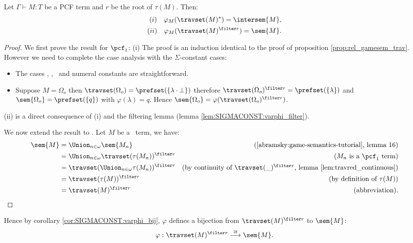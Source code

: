 \begin{proposition}
Let $\Gamma \vdash M : T$ be a PCF term and $r$ be the root of
$\tau(M)$. Then:
\begin{align*}
(i)  \quad\varphi_M(\travset(M)^*) = \intersem{M},  \\
(ii) \quad \varphi_M(\travset(M)^{\filter r}) = \sem{M}.
\end{align*}
\end{proposition}
\begin{proof}
We first prove the result for $\pcf_1$: (i) The proof is an
induction identical to the proof of proposition
\ref{prop:rel_gamesem_trav}. However we need to complete the case
analysis with the $\Sigma$-constant cases:
\begin{itemize}
\item The cases \pcfsucc, \pcfpred, \pcfcond\ and numeral constants are straightforward.

\item Suppose $M = \Omega_o$ then $\travset(\Omega_o) = \prefset ( \{ \lambda \cdot \bot \} )$ therefore
$\travset(\Omega_o)^{\filter r} = \prefset( \{ \lambda \} )$
and $\sem{\Omega_o} = \prefset( \{ q \})$ with $\varphi(\lambda) =
q$. Hence $\sem{\Omega_o} = \varphi
(\travset(\Omega_o)^{\filter r})$.
\end{itemize}
(ii) is a direct consequence of (i) and the filtering lemma (lemma
\ref{lem:SIGMACONST:varphi_filter}). \vspace{10pt}

\noindent We now extend the result to \pcf. Let $M$ be a \pcf\ term,
we have:
\begin{align*}
\sem{M} &= \Union_{n\in\omega} \sem{M_n} & (\mbox{\cite{abramsky:game-semantics-tutorial}, lemma 16})\\
&= \Union_{n\in\omega} \travset(\tau(M_n))^{\filter r} & (M_n \mbox{ is a $\pcf_1$ term}) \\
&= \travset(\Union_{n\in\omega} \tau(M_n) )^{\filter r} & (\mbox{by continuity of $\travset(\_)^{\filter r}$, lemma \ref{lem:travred_continuous}}) \\
&= \travset(\tau(M))^{\filter r} & (\mbox{by definition of } \tau(M)) \\
&= \travset(M)^{\filter r} & (\mbox{abbreviation}).
\end{align*}
\end{proof}

Hence by corollary \ref{cor:SIGMACONST:varphi_bij}, $\varphi$
defines a bijection from $\travset(M)^{\filter r}$ to
$\sem{M}$:
$$\varphi : \travset(M)^{\filter r} \stackrel{\cong}{\longrightarrow} \sem{M}.$$


